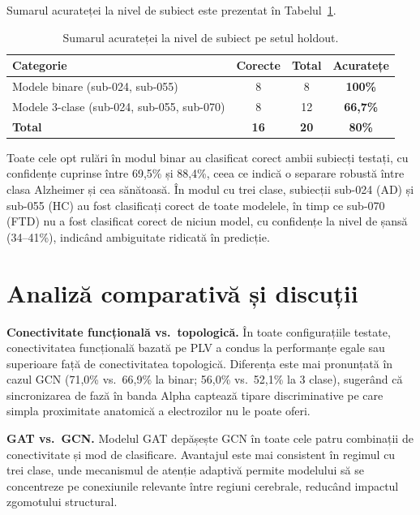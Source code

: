 \documentclass[12pt,a4paper]{report}
\theoremstyle{definition}
\theoremstyle{remark}
\begin{document}
Sumarul acurateței la nivel de subiect este prezentat în Tabelul~\ref{tab:holdout_summary}.

\begin{table}[H]
    \centering
    \caption{Sumarul acurateței la nivel de subiect pe setul holdout.}
    \label{tab:holdout_summary}
    \begin{tabular}{|l|c|c|c|}
        \hline
        \textbf{Categorie} & \textbf{Corecte} & \textbf{Total} & \textbf{Acuratețe} \\
        \hline
        Modele binare (sub-024, sub-055) & 8 & 8 & \textbf{100\%} \\
        \hline
        Modele 3-clase (sub-024, sub-055, sub-070) & 8 & 12 & \textbf{66,7\%} \\
        \hline
        \textbf{Total} & \textbf{16} & \textbf{20} & \textbf{80\%} \\
        \hline
    \end{tabular}
\end{table}

Toate cele opt rulări în modul binar au clasificat corect ambii subiecți testați,
cu confidențe cuprinse între 69,5\% și 88,4\%, ceea ce indică o separare robustă
între clasa Alzheimer și cea sănătoasă. În modul cu trei clase, subiecții sub-024
(AD) și sub-055 (HC) au fost clasificați corect de toate modelele, în timp ce
sub-070 (FTD) nu a fost clasificat corect de niciun model, cu confidențe la nivel
de șansă (34--41\%), indicând ambiguitate ridicată în predicție.

\section{Analiză comparativă și discuții}
\label{sec:discutii}

\textbf{Conectivitate funcțională vs.\ topologică.} În toate configurațiile testate,
conectivitatea funcțională bazată pe PLV a condus la performanțe egale sau superioare
față de conectivitatea topologică. Diferența este mai pronunțată în cazul GCN (71,0\%
vs.\ 66,9\% la binar; 56,0\% vs.\ 52,1\% la 3 clase), sugerând că sincronizarea
de fază în banda Alpha captează tipare discriminative pe care simpla proximitate
anatomică a electrozilor nu le poate oferi.

\textbf{GAT vs.\ GCN.} Modelul GAT depășește GCN în toate cele patru combinații
de conectivitate și mod de clasificare. Avantajul este mai consistent în regimul cu
trei clase, unde mecanismul de atenție adaptivă permite modelului să se concentreze
pe conexiunile relevante între regiuni cerebrale, reducând impactul zgomotului structural.
\end{document}
